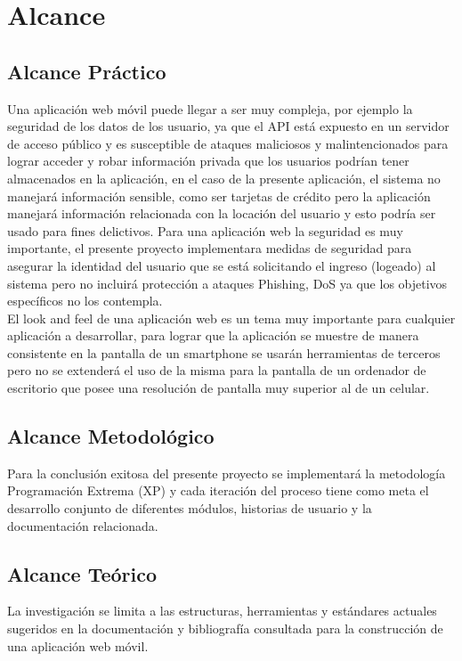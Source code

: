   \section{Alcance}
  \label{sec:Alcance}

    \subsection{Alcance Práctico}
    \label{sub:alcance_practico}
    Una aplicación web móvil puede llegar a ser muy compleja, por ejemplo la seguridad de los datos de los usuario, ya que el API está expuesto en un servidor de acceso público y es susceptible de ataques maliciosos y malintencionados para lograr acceder y robar información privada que los usuarios podrían tener almacenados en la aplicación, en el caso de la presente aplicación, el sistema no manejará información sensible, como ser tarjetas de crédito pero la aplicación manejará información relacionada con la locación del usuario y esto podría ser usado para fines delictivos. Para una aplicación web la seguridad es muy importante, el presente proyecto implementara medidas de seguridad para asegurar la identidad del usuario que se está solicitando el ingreso (logeado) al sistema pero no incluirá protección a ataques Phishing, DoS ya que los objetivos específicos no los contempla.\\


    El look and feel de una aplicación web es un tema muy importante para cualquier aplicación a desarrollar, para lograr que la aplicación se muestre de manera consistente en la pantalla de un smartphone se usarán herramientas de terceros pero no se extenderá el uso de la misma para la pantalla de un ordenador de escritorio que posee una resolución de pantalla muy superior al de un celular.\\




    \subsection{Alcance Metodológico}
    \label{sub:alcance_metodologico}
    Para la conclusión exitosa del presente proyecto se implementará la metodología  Programación Extrema (XP) y cada iteración del proceso tiene como meta el desarrollo conjunto de diferentes módulos, historias de usuario y la documentación relacionada.

    \subsection{Alcance Teórico}
    \label{sub:alcance_teorico}
    La investigación se limita a las estructuras, herramientas y estándares actuales sugeridos en la documentación y bibliografía consultada para la construcción de una aplicación web móvil.

